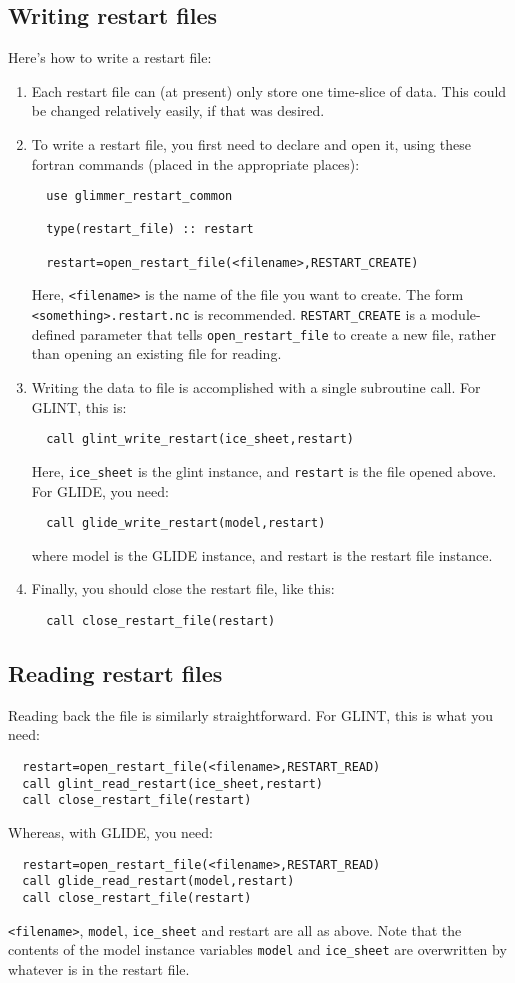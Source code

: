 \subsection{Writing restart files}
%
Here's how to write a restart file:
\begin{enumerate}
\item Each restart file can (at present) only store one time-slice of data. This 
could be changed relatively easily, if that was desired.
\item To write a restart file, you first need to declare and open it, using these 
fortran commands (placed in the appropriate places):
\begin{verbatim}
  use glimmer_restart_common

  type(restart_file) :: restart

  restart=open_restart_file(<filename>,RESTART_CREATE)
\end{verbatim}
Here, \texttt{<filename>} is the name of the file you want to
create. The form
\texttt{<something>.restart.nc} is
recommended. \texttt{RESTART\_CREATE} is a module-defined parameter
that tells \texttt{open\_restart\_file} to create a new file, rather
than opening an existing file for reading.

\item Writing the data to file is accomplished with a single subroutine call. For 
GLINT, this is:
\begin{verbatim}
  call glint_write_restart(ice_sheet,restart)
\end{verbatim}
Here, \texttt{ice\_sheet} is the glint instance, and \texttt{restart} is the file opened above. 
For GLIDE, you need:
\begin{verbatim}
  call glide_write_restart(model,restart)
\end{verbatim}
where model is the GLIDE instance, and restart is the restart file instance.

\item Finally, you should close the restart file, like this:
\begin{verbatim}
  call close_restart_file(restart)
\end{verbatim}
\end{enumerate}
%
\subsection{Reading restart files}
%
Reading back the file is similarly straightforward. For GLINT, this is what 
you need:
\begin{verbatim}
  restart=open_restart_file(<filename>,RESTART_READ)
  call glint_read_restart(ice_sheet,restart)
  call close_restart_file(restart)
\end{verbatim}
Whereas, with GLIDE, you need:
\begin{verbatim}
  restart=open_restart_file(<filename>,RESTART_READ)
  call glide_read_restart(model,restart)
  call close_restart_file(restart)
\end{verbatim}
\texttt{<filename>}, \texttt{model}, \texttt{ice\_sheet} and restart are all as above. Note that the 
contents of the model instance variables \texttt{model} and \texttt{ice\_sheet} are 
overwritten by whatever is in the restart file.
%
